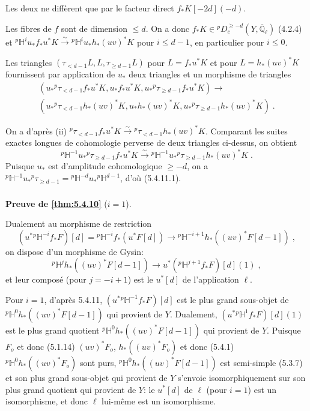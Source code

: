 \documentclass[12pt,a4paper]{article}
\theoremstyle{plain}
\theoremstyle{definition}
\theoremstyle{remark}
\newcommand{\HH}{\mathbb{H}}
\newcommand{\QQ}{\mathbb{Q}}
\begin{document}
Les deux ne diff\`erent que par le facteur direct $f_*K[-2d](-d)$.

Les fibres de $f$ sont de dimension $\leq d$. On a donc $f_*K \in {}^{p}D^{\geq -d}_c(Y, \overline{\QQ}_{\ell})$ (4.2.4) et ${}^{p}\HH^iu_*f_*u^*K \xrightarrow{\sim} {}^{p}\HH^iu_*h_*(uv)^*K$ pour $i \leq d-1$, en particulier pour $i \leq 0$.

Les triangles $(\tau_{<d-1}L, L, \tau_{\geq d-1}L)$ pour $L = f_*u^*K$ et pour $L = h_*(uv)^*K$ fournissent par application de $u_*$ deux triangles et un morphisme de triangles
\begin{multline*}
(u_*{}^{p}\tau_{<d-1}f_*u^*K, u_*f_*u^*K, u_*{}^{p}\tau_{\geq d-1}f_*u^*K) \longrightarrow \\
(u_*{}^{p}\tau_{<d-1}h_*(uv)^*K, u_*h_*(uv)^*K, u_*{}^{p}\tau_{\geq d-1}h_*(uv)^*K)\;.
\end{multline*}

On a d'apr\`es (ii) ${}^{p}\tau_{<d-1}f_*u^*K \xrightarrow{\sim} {}^{p}\tau_{<d-1}h_*(uv)^*K$. Comparant les suites exactes longues de cohomologie perverse de deux triangles ci-dessus, on obtient
\[
{}^{p}\HH^{-1}u_*{}^{p}\tau_{\geq d-1}f_*u^*K \xrightarrow{\sim} {}^{p}\HH^{-1}u_*{}^{p}\tau_{\geq d-1}h_*(uv)^*K\;.
\]
Puisque $u_*$ est d'amplitude cohomologique $\geq -d$, on a ${}^{p}\HH^{-1}u_*{}^{p}\tau_{\geq d-1} = {}^{p}\HH^{-d}u_*{}^{p}\HH^{d-1}$, d'o\`u (5.4.11.1).

\subsubsection{}
\textbf{Preuve de \ref{thm:5.4.10}} ($i = 1$).

Dualement au morphisme de restriction
\[
(u^*{}^{p}\HH^{-i}f_*F)[d] = {}^{p}\HH^{-i}f_*(u^*F[d]) \longrightarrow {}^{p}\HH^{-i+1}h_*((uv)^*F[d-1])\;,
\]
on dispose d'un morphisme de Gysin:
\[
{}^{p}\HH^jh_*((uv)^*F[d-1]) \longrightarrow u^*({}^{p}\HH^{j+1}f_*F)[d](1)\;,
\]
et leur compos\'e (pour $j = -i+1$) est le $u^*[d]$ de l'application $\ell$.

Pour $i = 1$, d'apr\`es 5.4.11, $(u^*{}^{p}\HH^{-1}f_*F)[d]$ est le plus grand sous-objet de ${}^{p}\HH^0h_*((uv)^*F[d-1])$ qui provient de $Y$. Dualement, $(u^*{}^{p}\HH^1f_*F)[d](1)$ est le plus grand quotient ${}^{p}\HH^0h_*((uv)^*F[d-1])$ qui provient de $Y$. Puisque $F_o$ et donc (5.1.14) $(uv)^*F_o$, $h_*((uv)^*F_o)$ et donc (5.4.1) ${}^{p}\HH^0h_*((uv)^*F_o)$ sont purs, ${}^{p}\HH^0h_*((uv)^*F[d-1])$ est semi-simple (5.3.7) et son plus grand sous-objet qui provient de $Y$ s'envoie isomorphiquement sur son plus grand quotient qui provient de $Y$: le $u^*[d]$ de $\ell$ (pour $i=1$) est un isomorphisme, et donc $\ell$ lui-m\^eme est un isomorphisme.
\end{document}
